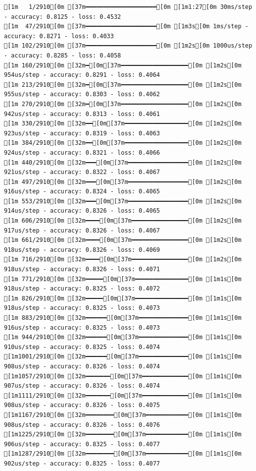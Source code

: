 \documentclass[
  letterpaper,
  DIV=11,
  numbers=noendperiod]{scrartcl}
\begin{document}
\begin{verbatim}
[1m   1/2910[0m [37m━━━━━━━━━━━━━━━━━━━━[0m [1m1:27[0m 30ms/step - accuracy: 0.8125 - loss: 0.4532
[1m  47/2910[0m [37m━━━━━━━━━━━━━━━━━━━━[0m [1m3s[0m 1ms/step - accuracy: 0.8271 - loss: 0.4033   
[1m 102/2910[0m [37m━━━━━━━━━━━━━━━━━━━━[0m [1m2s[0m 1000us/step - accuracy: 0.8285 - loss: 0.4058
[1m 160/2910[0m [32m━[0m[37m━━━━━━━━━━━━━━━━━━━[0m [1m2s[0m 954us/step - accuracy: 0.8291 - loss: 0.4064 
[1m 213/2910[0m [32m━[0m[37m━━━━━━━━━━━━━━━━━━━[0m [1m2s[0m 955us/step - accuracy: 0.8303 - loss: 0.4062
[1m 270/2910[0m [32m━[0m[37m━━━━━━━━━━━━━━━━━━━[0m [1m2s[0m 942us/step - accuracy: 0.8313 - loss: 0.4061
[1m 330/2910[0m [32m━━[0m[37m━━━━━━━━━━━━━━━━━━[0m [1m2s[0m 923us/step - accuracy: 0.8319 - loss: 0.4063
[1m 384/2910[0m [32m━━[0m[37m━━━━━━━━━━━━━━━━━━[0m [1m2s[0m 924us/step - accuracy: 0.8321 - loss: 0.4066
[1m 440/2910[0m [32m━━━[0m[37m━━━━━━━━━━━━━━━━━[0m [1m2s[0m 921us/step - accuracy: 0.8322 - loss: 0.4067
[1m 497/2910[0m [32m━━━[0m[37m━━━━━━━━━━━━━━━━━[0m [1m2s[0m 916us/step - accuracy: 0.8324 - loss: 0.4065
[1m 553/2910[0m [32m━━━[0m[37m━━━━━━━━━━━━━━━━━[0m [1m2s[0m 914us/step - accuracy: 0.8326 - loss: 0.4065
[1m 606/2910[0m [32m━━━━[0m[37m━━━━━━━━━━━━━━━━[0m [1m2s[0m 917us/step - accuracy: 0.8326 - loss: 0.4067
[1m 661/2910[0m [32m━━━━[0m[37m━━━━━━━━━━━━━━━━[0m [1m2s[0m 918us/step - accuracy: 0.8326 - loss: 0.4069
[1m 716/2910[0m [32m━━━━[0m[37m━━━━━━━━━━━━━━━━[0m [1m2s[0m 918us/step - accuracy: 0.8326 - loss: 0.4071
[1m 771/2910[0m [32m━━━━━[0m[37m━━━━━━━━━━━━━━━[0m [1m1s[0m 918us/step - accuracy: 0.8325 - loss: 0.4072
[1m 826/2910[0m [32m━━━━━[0m[37m━━━━━━━━━━━━━━━[0m [1m1s[0m 918us/step - accuracy: 0.8325 - loss: 0.4073
[1m 883/2910[0m [32m━━━━━━[0m[37m━━━━━━━━━━━━━━[0m [1m1s[0m 916us/step - accuracy: 0.8325 - loss: 0.4073
[1m 944/2910[0m [32m━━━━━━[0m[37m━━━━━━━━━━━━━━[0m [1m1s[0m 910us/step - accuracy: 0.8325 - loss: 0.4074
[1m1001/2910[0m [32m━━━━━━[0m[37m━━━━━━━━━━━━━━[0m [1m1s[0m 908us/step - accuracy: 0.8326 - loss: 0.4074
[1m1057/2910[0m [32m━━━━━━━[0m[37m━━━━━━━━━━━━━[0m [1m1s[0m 907us/step - accuracy: 0.8326 - loss: 0.4074
[1m1111/2910[0m [32m━━━━━━━[0m[37m━━━━━━━━━━━━━[0m [1m1s[0m 908us/step - accuracy: 0.8326 - loss: 0.4075
[1m1167/2910[0m [32m━━━━━━━━[0m[37m━━━━━━━━━━━━[0m [1m1s[0m 908us/step - accuracy: 0.8326 - loss: 0.4076
[1m1225/2910[0m [32m━━━━━━━━[0m[37m━━━━━━━━━━━━[0m [1m1s[0m 906us/step - accuracy: 0.8325 - loss: 0.4077
[1m1287/2910[0m [32m━━━━━━━━[0m[37m━━━━━━━━━━━━[0m [1m1s[0m 902us/step - accuracy: 0.8325 - loss: 0.4077

\end{verbatim}
\end{document}
